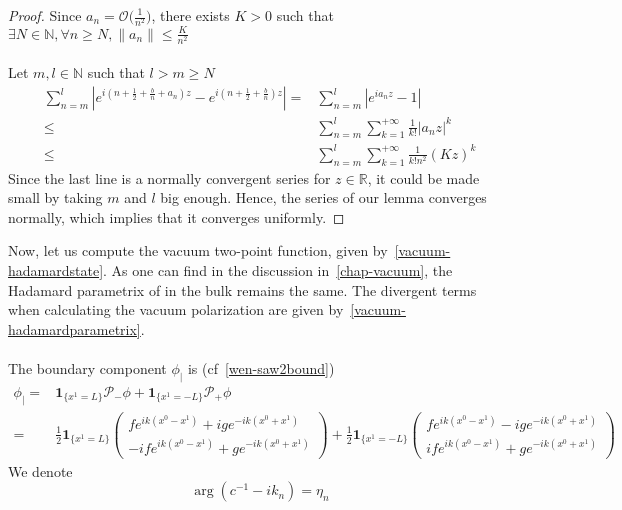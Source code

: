 \begin{proof}
Since $a_n = \mathcal{O}\big(\frac{1}{n^2}\big)$, 
there exists $ K > 0$ such that $ \exists N \in\mathbb{N}, \forall n\geq N, \| a_n\| \leq \frac{K}{n^2}$ \\\\
Let $m,l\in\mathbb{N}$ such that $l > m \geq N$
\begin{equation*}
\begin{split}
\sum_{n=m}^{l}  | e^{i(n + \frac 1 2+\frac{b}{n}+a_n)z } - e^{i(n+\frac 1 2+\frac{b}{n})z } | = & 
\sum_{n=m}^{l} | e^{ia_n z} - 1 | \\
%
\leq & \sum_{n=m}^{l}\sum_{k=1}^{+\infty}\frac{1}{k!}| a_n z |^k \\
%
\leq & \sum_{n=m}^l \sum_{k=1}^{+\infty}\frac{1}{k!n^2}(Kz)^k
\end{split}
\end{equation*}
Since the last line is a normally convergent series for $z \in \mathbb{R}$, it could be made small by taking $m$ and $l$ big enough.
Hence, the series of our lemma converges normally, which implies that it converges uniformly.
\end{proof}
Now, let us compute the vacuum two-point function, given by~\cref{vacuum-hadamardstate}.
As one can find in the discussion in~\cref{chap-vacuum}, the Hadamard parametrix of in the bulk remains the same. 
The divergent terms when calculating the vacuum polarization are given by~\cref{vacuum-hadamardparametrix}. \\\\
The boundary component $\phi_|$ is (cf~\cref{wen-saw2bound})
\begin{equation*}
\begin{split}
\phi_| = & \mathbf{1}_{\{x^1 = L\}} \mathcal{P}_-\phi + \mathbf{1}_{\{x^1 = -L\}} \mathcal{P}_+\phi \\
%
= & \frac 1 2 \mathbf{1}_{\{x^1 = L\} } \begin{pmatrix} f e^{ik(x^0 -x^1)} + ig e^{-ik(x^0 + x^1)} \\
-if e^{ik(x^0 - x^1)} + g e^{-ik(x^0+x^1)}\end{pmatrix}
+ \frac 1 2 \mathbf{1}_{\{x^1 = - L\} } \begin{pmatrix} f e^{ik(x^0 -x^1)} - ig e^{-ik(x^0 + x^1)} \\
if e^{ik(x^0 - x^1)} + g e^{-ik(x^0+x^1)}\end{pmatrix} 
\end{split}
\end{equation*}
We denote
\begin{equation*}
\arg(c^{-1} - ik_n) = \eta_n
\end{equation*}
